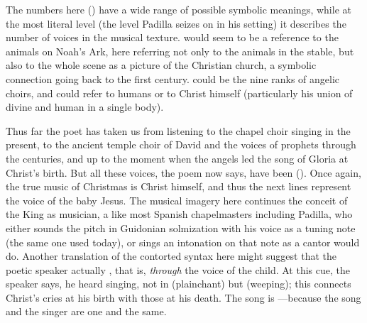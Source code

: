 The numbers here () have a wide
range of possible symbolic meanings, while at the most literal level (the level
Padilla seizes on in his setting) it describes the number of voices in the
musical texture.
 would seem to be a reference to the animals on Noah's Ark,
here referring not only to the animals in the stable, but also to the whole
scene as a picture of the Christian church, a symbolic connection going back to
the first century.
 could be the nine ranks of angelic choirs\citXXX{}, and
 could refer to humans or to Christ himself (particularly his
union of divine and human in a single body).\citXXX

Thus far the poet has taken us from listening to the chapel choir singing in the
present, to the ancient temple choir of David and the voices of prophets through
the centuries, and up to the moment when the angels led the song of Gloria at
Christ's birth.
But all these voices, the poem now says, have been  ().
Once again, the true music of Christmas is Christ himself, and thus the next
lines represent the voice of the baby Jesus.
The musical imagery here continues the conceit of the King as musician, a
 like most Spanish chapelmasters including Padilla,
who either sounds the pitch  in Guidonian solmization with
his voice as a tuning note (the same one used today), or sings an intonation on
that note as a cantor would do.
Another translation of the contorted syntax here might suggest that the poetic
speaker actually , that is,
\emph{through} the voice of the child.
At this cue, the speaker says, he heard singing, not in  (plainchant) but  (weeping); this connects
Christ's cries at his birth with those at his death.\citXXX
The song is ---because the song and the singer are one and the same.

